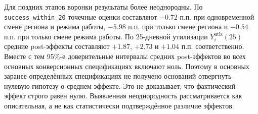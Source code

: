 \documentclass[14pt,a4paper]{extarticle}
\begin{document}
Для поздних этапов воронки результаты более неоднородны. По \texttt{success\_within\_20} точечные оценки составляют \(-0.72\) п.п. при одновременной смене региона и режима работы, \(-5.98\) п.п. при только смене региона и \(-0.54\) п.п. при только смене режима работы. По 25-дневной утилизации \(Y_i^{\mathrm{utlz}}(25)\) средние post-эффекты составляют \(+1.87\), \(+2.73\) и \(+1.04\) п.п. соответственно. Вместе с тем 95\%-е доверительные интервалы средних post-эффектов во всех основных конверсионных спецификациях включают ноль. Поэтому в основных заранее определённых спецификациях не получено оснований отвергнуть нулевую гипотезу о среднем эффекте. Это не доказывает, что фактический эффект строго равен нулю. Выявленная неоднородность рассматривается как описательная, а не как статистически подтверждённое различие эффектов.
\end{document}
